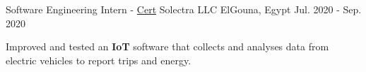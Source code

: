 

\begin{cventries}

   \cventry
     {Software Engineering Intern - \tiny{\href{https://github.com/mido3ds/cv/raw/master/certs/solectra.pdf}{Cert}}} %
     {Solectra LLC} %
     {ElGouna, Egypt} %
     {Jul. 2020 - Sep. 2020} %
     {
       \begin{cvitems} %
       \item{Improved and tested an \textbf{IoT} software that collects and analyses data from electric vehicles to report trips and energy.}
       \end{cvitems}
     }

\end{cventries}

